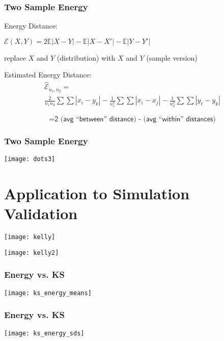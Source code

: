 \documentclass[presentation]{beamer}
\begin{document}
\begin{frame}
  \frametitle{Two Sample Energy}
  \begin{block}{Energy Distance:}
    \begin{center}
      $\mathcal{E}(X,Y) = 2\mathbb{E}|X - Y| - \mathbb{E}|X - X'| -
      \mathbb{E}|Y - Y'|$
    \end{center}
  \end{block}
  replace $X$ and $Y$ (distribution) with $X$ and $Y$ (sample version)
  \begin{block}{Estimated Energy Distance:}
    \begin{gather*}
      \hat{\mathcal{E}}_{n_1, n_2} = \\ \frac{2}{n_1 n_2} \sum \sum |x_i - y_k| -
      \frac{1}{n_1^2} \sum \sum |x_i - x_j| - \frac{1}{n_2^2} \sum \sum |y_\ell - y_k| 
    \end{gather*}
    
    \begin{displaymath}
      = \textsf{2 (avg ``between'' distance) - (avg ``within'' distances)}
    \end{displaymath}
  \end{block}
\end{frame}

\begin{frame}
  \frametitle{Two Sample Energy}
  \begin{center}
    \texttt{[image: dots3]}
  \end{center}
\end{frame}

\section{Application to Simulation Validation}

\begin{frame}
  \texttt{[image: kelly]}
\end{frame}

\begin{frame}
  \texttt{[image: kelly2]}
\end{frame}

\begin{frame}
  \frametitle{Energy vs. KS}
  \texttt{[image: ks\_energy\_means]} 
\end{frame}


\begin{frame}
  \frametitle{Energy vs. KS}
  \texttt{[image: ks\_energy\_sds]} 
\end{frame}
\end{document}
